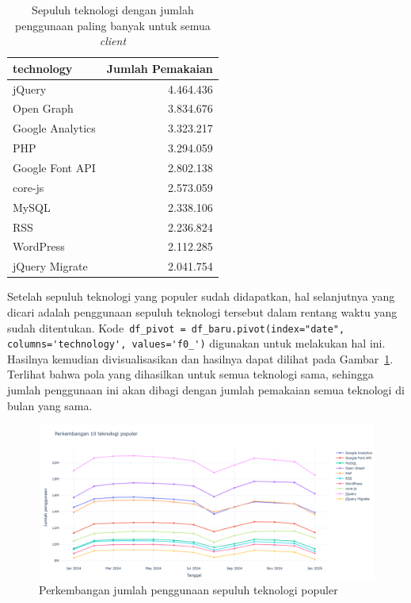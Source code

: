 \begin{table}[H]
    \centering
    \caption{Sepuluh teknologi dengan jumlah penggunaan paling banyak untuk semua \textit{client}}
    \label{tab:sepuluhsemua}
    \begin{tabular}{|l|r|}
        \hline
        technology & Jumlah Pemakaian \\ \hline
        jQuery & 4.464.436 \\ \hline
        Open Graph & 3.834.676 \\ \hline
        Google Analytics & 3.323.217 \\ \hline
        PHP & 3.294.059 \\ \hline
        Google Font API & 2.802.138 \\ \hline
        core-js & 2.573.059 \\ \hline
        MySQL & 2.338.106 \\ \hline
        RSS & 2.236.824 \\ \hline
        WordPress & 2.112.285 \\ \hline
        jQuery Migrate & 2.041.754 \\ \hline
    \end{tabular}
\end{table}
Setelah sepuluh teknologi yang populer sudah didapatkan, hal selanjutnya yang dicari adalah penggunaan sepuluh teknologi tersebut dalam rentang waktu yang sudah ditentukan. Kode~\verb|df_pivot = df_baru.pivot(index="date", columns='technology', values='f0_')| digunakan untuk melakukan hal ini. Hasilnya kemudian divisualisasikan dan hasilnya dapat dilihat pada Gambar~\ref{fig:samplejumlah10}. Terlihat bahwa pola yang dihasilkan untuk semua teknologi sama, sehingga jumlah penggunaan ini akan dibagi dengan jumlah pemakaian semua teknologi di bulan yang sama.

\begin{figure}[H]
    \centering
    \includegraphics[width=0.7\linewidth]{Gambar/Perkembangan jumlah 10 teknologi populer.png}
    \caption{Perkembangan jumlah penggunaan sepuluh teknologi populer}
    \label{fig:samplejumlah10}
\end{figure}

